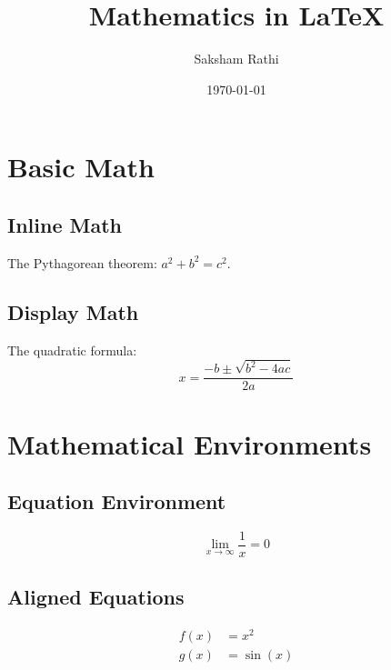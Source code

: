 \documentclass{article} %
\begin{document}

\title{Mathematics in LaTeX} %
\author{Saksham Rathi} %
\date{\today} %
\maketitle %

\section{Basic Math} %

\subsection{Inline Math} %
The Pythagorean theorem: $a^2 + b^2 = c^2$. %

\subsection{Display Math} %
The quadratic formula: %
\[ x = \frac{-b \pm \sqrt{b^2 - 4ac}}{2a} \] %

\section{Mathematical Environments} %

\subsection{Equation Environment} %
\begin{equation} %
    \lim_{x \to \infty} \frac{1}{x} = 0 %
\end{equation} %

\subsection{Aligned Equations} %
\begin{align} %
    f(x) &= x^2 \\ %
    g(x) &= \sin(x) %
\end{align} %
\end{document}
